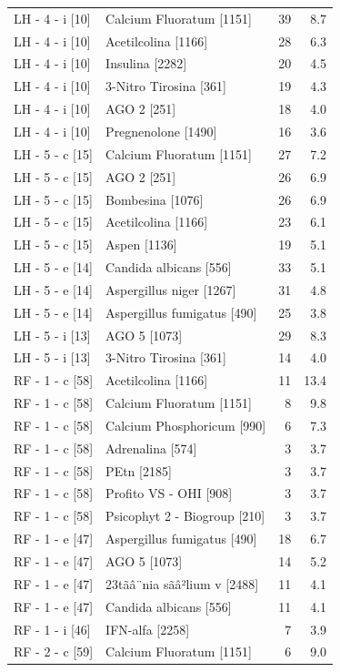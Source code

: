 \documentclass[a4paper,11pt]{article}
\begin{document}
\begin{footnotesize}
\begin{longtable}{p{3.5cm}p{7.5cm}rr}
LH - 4 - i [10] & Calcium Fluoratum [1151] & 39 & 8.7 \\
LH - 4 - i [10] & Acetilcolina [1166] & 28 & 6.3 \\
LH - 4 - i [10] & Insulina [2282] & 20 & 4.5 \\
LH - 4 - i [10] & 3-Nitro Tirosina [361] & 19 & 4.3 \\
LH - 4 - i [10] & AGO 2 [251] & 18 & 4.0 \\
LH - 4 - i [10] & Pregnenolone [1490] & 16 & 3.6 \\
LH - 5 - c [15] & Calcium Fluoratum [1151] & 27 & 7.2 \\
LH - 5 - c [15] & AGO 2 [251] & 26 & 6.9 \\
LH - 5 - c [15] & Bombesina [1076] & 26 & 6.9 \\
LH - 5 - c [15] & Acetilcolina [1166] & 23 & 6.1 \\
LH - 5 - c [15] & Aspen [1136] & 19 & 5.1 \\
LH - 5 - e [14] & Candida albicans [556] & 33 & 5.1 \\
LH - 5 - e [14] & Aspergillus niger [1267] & 31 & 4.8 \\
LH - 5 - e [14] & Aspergillus fumigatus [490] & 25 & 3.8 \\
LH - 5 - i [13] & AGO 5 [1073] & 29 & 8.3 \\
LH - 5 - i [13] & 3-Nitro Tirosina [361] & 14 & 4.0 \\
RF - 1 - c [58] & Acetilcolina [1166] & 11 & 13.4 \\
RF - 1 - c [58] & Calcium Fluoratum [1151] & 8 & 9.8 \\
RF - 1 - c [58] & Calcium Phosphoricum [990] & 6 & 7.3 \\
RF - 1 - c [58] & Adrenalina [574] & 3 & 3.7 \\
RF - 1 - c [58] & PEtn [2185] & 3 & 3.7 \\
RF - 1 - c [58] & Profito VS - OHI [908] & 3 & 3.7 \\
RF - 1 - c [58] & Psicophyt  2 - Biogroup [210] & 3 & 3.7 \\
RF - 1 - e [47] & Aspergillus fumigatus [490] & 18 & 6.7 \\
RF - 1 - e [47] & AGO 5 [1073] & 14 & 5.2 \\
RF - 1 - e [47] & 23tãâ¨nia sãâ²lium v [2488] & 11 & 4.1 \\
RF - 1 - e [47] & Candida albicans [556] & 11 & 4.1 \\
RF - 1 - i [46] & IFN-alfa [2258] & 7 & 3.9 \\
RF - 2 - c [59] & Calcium Fluoratum [1151] & 6 & 9.0 \\

\end{longtable}
\end{footnotesize}
\end{document}
